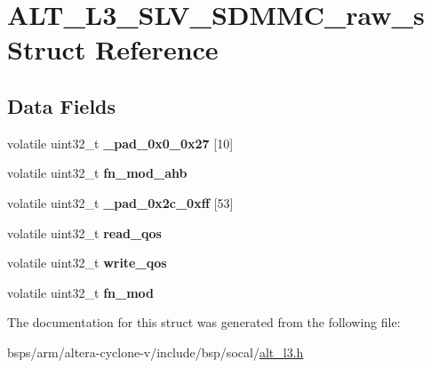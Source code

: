 \hypertarget{structALT__L3__SLV__SDMMC__raw__s}{}\section{A\+L\+T\+\_\+\+L3\+\_\+\+S\+L\+V\+\_\+\+S\+D\+M\+M\+C\+\_\+raw\+\_\+s Struct Reference}
\label{structALT__L3__SLV__SDMMC__raw__s}
\subsection*{Data Fields}
\begin{DoxyCompactItemize}
\item 
\mbox{\label{structALT__L3__SLV__SDMMC__raw__s_ab7e64c1ac004185bbd9055d7b038d5ee}} 
volatile uint32\+\_\+t {\bfseries \+\_\+pad\+\_\+0x0\+\_\+0x27} \mbox{[}10\mbox{]}
\item 
\mbox{\label{structALT__L3__SLV__SDMMC__raw__s_a37edfa07520de7c9adaab0766990b1f4}} 
volatile uint32\+\_\+t {\bfseries fn\+\_\+mod\+\_\+ahb}
\item 
\mbox{\label{structALT__L3__SLV__SDMMC__raw__s_af214ccd8925a46c0422eeffba9842a61}} 
volatile uint32\+\_\+t {\bfseries \+\_\+pad\+\_\+0x2c\+\_\+0xff} \mbox{[}53\mbox{]}
\item 
\mbox{\label{structALT__L3__SLV__SDMMC__raw__s_ac574a8f4f62482f65bc2915e1f02ace1}} 
volatile uint32\+\_\+t {\bfseries read\+\_\+qos}
\item 
\mbox{\label{structALT__L3__SLV__SDMMC__raw__s_a6273fc68b97cadc244a2001271f0c2a0}} 
volatile uint32\+\_\+t {\bfseries write\+\_\+qos}
\item 
\mbox{\label{structALT__L3__SLV__SDMMC__raw__s_a79297aedc4171d1bf4cd203c6348e34a}} 
volatile uint32\+\_\+t {\bfseries fn\+\_\+mod}
\end{DoxyCompactItemize}


The documentation for this struct was generated from the following file\+:\begin{DoxyCompactItemize}
\item 
bsps/arm/altera-\/cyclone-\/v/include/bsp/socal/\mbox{\hyperlink{alt__l3_8h}{alt\+\_\+l3.\+h}}\end{DoxyCompactItemize}
